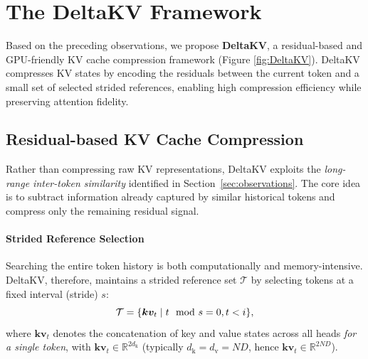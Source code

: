 \section{The DeltaKV Framework}
\label{sec:method}

Based on the preceding observations, we propose \textbf{DeltaKV}, a residual-based and GPU-friendly KV cache compression framework (Figure \ref{fig:DeltaKV}). 
DeltaKV compresses KV states by encoding the residuals between the current token and a small set of selected strided references, enabling high compression efficiency while preserving attention fidelity.
\vspace{-0.25em}

\subsection{Residual-based KV Cache Compression}
\label{sec:method:compression}

\vspace{-0.25em}
Rather than compressing raw KV representations, DeltaKV exploits the \emph{long-range inter-token similarity} identified in Section~\ref{sec:observations}. 
The core idea is to subtract information already captured by similar historical tokens and compress only the remaining residual signal. 

\paragraph{Strided Reference Selection} 
Searching the entire token history is both computationally and memory-intensive.
DeltaKV, therefore, maintains a strided reference set $\mathcal{T}$ by selecting tokens at a fixed interval (stride) $s$: 
\vspace{-0.25em}
\begin{displaymath}
  \mathcal{T} = \{ \bm{kv}_t \mid t \mod s = 0, t < i \}, 
  \vspace{-0.25em}
\end{displaymath}
where $\bm{kv}_t$ denotes the concatenation of key and value states across all heads \emph{for a single token}, with $\bm{kv}_t \in \mathbb{R}^{2d_\mathrm{k}}$ (typically $d_\mathrm{k}=d_\mathrm{v}=ND$, hence $\bm{kv}_t \in \mathbb{R}^{2ND}$).

